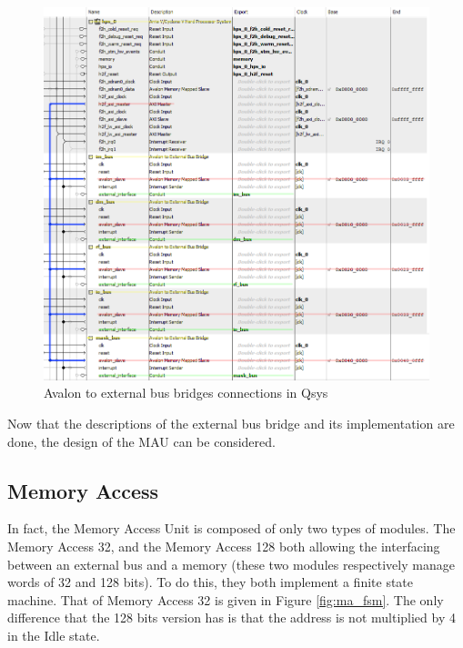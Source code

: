 \begin{figure}[ht!]
    \center
    \includegraphics[width=\linewidth]{"Chapter5-MAU_CTRLU/res/qsys_mau.PNG"}
    \caption{Avalon to external bus bridges connections in Qsys}
    \label{fig:avalon/bus}
\end{figure}

Now that the descriptions of the external bus bridge and its implementation are done, the design of 
the MAU can be considered.

\subsection{Memory Access}

In fact, the Memory Access Unit is composed of only two types of modules. The Memory Access 32, and 
the Memory Access 128 both allowing the interfacing between an external bus and a memory (these two
modules respectively manage words of 32 and 128 bits). To do this, they both implement a finite state machine. 
That of Memory Access 32 is given in Figure \ref{fig:ma_fsm}. The only difference that the 128 bits version 
has is that the address is not multiplied by 4 in the Idle state. 

